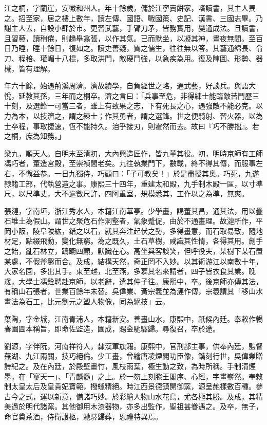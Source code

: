 \begin{pinyinscope}
江之桐，字蘭崖，安徽和州人。年十餘歲，傭於江寧賣餅家，嗜讀書，其主人異之。招至家，居之樓上數年，讀左傳、國語、戰國策、史記、漢書、三國志畢。乃謝主人去，自設小肆於市。更習武藝，手臂刀矛，皆務實用，變通成法。且讀書，且習藝，讀稍倦，則趫舉翕張，以作其氣。已而默坐，以凝其神，晝夜無間。至百日乃睡，睡十餘日，復如之。讀史善疑，質之儒生，往往無以答。其藝通綿長、俞刀、程棓、瓘嵋十八棍，多取洪門，敵硬鬥強，以急疾為用。復及陣圖、形勢、器械，皆有理解。

年六十餘，始遇荊溪周濟。濟故績學，自負經世之略，通武藝，好談兵。與語大悅，延教其孫，三年而之桐卒。濟之言曰：「兵事至危，非得練士能臨敵苦鬥歷三十刻，及選鋒一可當三者，雖上有致果之志，下有死長之心，遇強敵不能必克。以力為本，以技濟之，謂之練士；作其勇者，謂之選鋒。世之便騎射、習火器，以為士卒程，事取捷速，恆不能持久。洎乎接刃，則霍然而去。故曰『巧不勝拙』。若之桐，庶為知務。」

梁九，順天人。自明末至清初，大內興造匠作，皆九董其役。初，明時京師有工師馮巧者，董造宮殿，至崇禎間老矣。九往執業門下，數載，終不得其傳，而服事左右，不懈益恭。一日九獨侍，巧顧曰：「子可教矣！」於是盡授其奧。巧死，九遂隸籍工部，代執營造之事。康熙三十四年，重建太和殿，九手制木殿一區，以寸準尺，以尺準丈，大不逾數尺許，四阿重室，規模悉其，工作以之為準，無爽。

張漣，字南垣，浙江秀水人，本籍江南華亭。少學畫，謁董其昌，通其法，用以疊石堆土為假山。謂世之聚危石作洞壑者，氣象蹙促，由於不通畫理。故漣所作，平岡小阪，陵阜陂紘，錯之以石，就其奔注起伏之勢，多得畫意，而石取易致，隨地材足，點綴飛動，變化無窮。為之既久，土石草樹，咸識其性情，各得其用。創手之始，亂石林立，躊躕四顧，默識在心。高坐與客談笑，但呼役夫，某樹下某石置某處，不假斧鑿而合。及成，結構天然，奇正罔不入妙。以其術游江以南數十年，大家名園，多出其手。東至越，北至燕，多慕其名來請者，四子皆衣食其業。晚歲，大學士馮銓聘赴京師，以老辭，遣其仲子往。康熙中，卒。後京師亦傳其法，有稱山石張者，世業百餘年未替。吳偉業、黃宗羲並為漣作傳，宗羲謂其「移山水畫法為石工，比元劉元之塑人物像，同為絕技」云。

葉陶，字金城，江南青浦人，本籍新安。善畫山水，康熙中，祇候內廷。奉敕作暢春園圖本稱旨，即命佐監造，園成，賜金馳驛歸。尋復召，卒於途。

劉源，字伴阮，河南祥符人，隸漢軍旗籍。康熙中，官刑部主事，供奉內廷，監督蕪湖、九江兩關，技巧絕倫。少工畫，曾繪唐凌煙閣功臣像，鐫刻行世，吳偉業贈詩紀之。及在內廷，於殿壁畫竹，風枝雨葉，極生動之致，為時所稱。手制清煙墨，在「寥天一」、「青麟髓」之上。於一笏上刻滕王閣序、心經，字畫嶄然。奉敕制太皇太后及皇貴妃寶範，撥蠟精絕。時江西景德鎮開御窯，源呈赩樣數百種。參古今之式，運以新意，備諸巧妙。於彩繪人物山水花鳥，尤各極其勝。及成，其精美過於明代諸窯。其他御用木漆器物，亦多出監作，聖祖甚眷遇之。及卒，無子，命官奠茶酒，侍衛護柩，馳驛歸葬，恩禮特異焉。


\end{pinyinscope}
